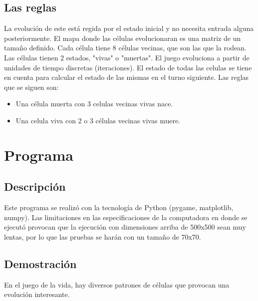 \documentclass[10pt]{article}
\begin{document}
        \subsection{Las reglas}
            La evolución de este está regida por el estado inicial y no necesita entrada alguna posteriormente. El mapa donde las células evolucionaran es una matriz de un tamaño definido. Cada célula tiene 8 células vecinas, que son las que la rodean. Las células tienen 2 estados, "vivas" o "muertas". El juego evoluciona a partir de unidades de tiempo discretas (iteraciones). El estado de todas las celulas se tiene en cuenta para calcular el estado de las mismas en el turno siguiente. Las reglas que se siguen son:
            \begin{itemize}
                \item Una célula muerta con 3 celulas vecinas vivas nace. 
                \item Una celula viva con 2 o 3 células vecinas vivas muere.
            \end{itemize}
		
        

    
    \section{Programa}	
		\subsection{Descripción}
        Este programa se realizó con la tecnología de Python (pygame, matplotlib, numpy). Las limitaciones en las especificaciones de la computadora en donde se ejecutó provocan que la ejecución con dimensiones arriba de 500x500 sean muy lentas, por lo que las pruebas se harán con un tamaño de 70x70. 
        \subsection{Demostración}
        En el juego de la vida, hay diversos patrones de células que provocan una evolución interesante.
\end{document}
